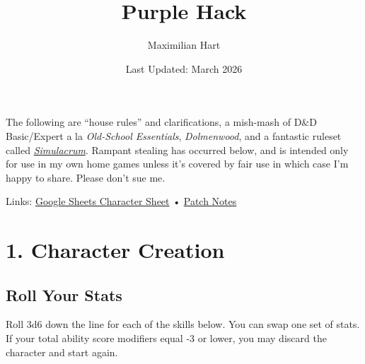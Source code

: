\documentclass{book}
\title{Purple Hack}
\author{Maximilian Hart}
\date{Last Updated: March 2026}
\begin{document}
\begin{titlingpage}
\maketitle
\end{titlingpage}
\newpage

\setcounter{page}{2}

\AtBeginShipoutNext{\AtBeginShipoutDiscard}%


\tableofcontents

\vfill

The following are ``house rules'' and clarifications, a mish-mash of D\&D Basic/Expert a la \emph{Old-School Essentials}, \emph{Dolmenwood}, and a fantastic ruleset called \emph{\href{https://osrsimulacrum.blogspot.com/2021/06/simulacrum-beta-release.html}{Simulacrum}}. Rampant stealing has occurred below, and is intended only for use in my own home games unless it's covered by fair use in which case I'm happy to share. Please don't sue me.

Links: \href{https://docs.google.com/spreadsheets/d/1wOavveRJ8IEVoqvy33bxn12m20Y_7lqOkc9_KuXwJHo/copy}{Google Sheets Character Sheet} • \href{https://monogr.ph/694bf3d97da4a20a582eec2c}{Patch Notes}

\setcounter{page}{3}

\newpage


\section*{1. Character Creation}\label{character-creation}


\subsection*{Roll Your Stats}\label{roll-your-stats}

Roll 3d6 down the line for each of the skills below. You can swap one
set of stats. If your total ability score modifiers equal -3 or lower,
you may discard the character and start again.
\end{document}
